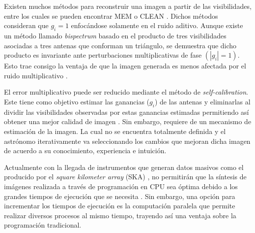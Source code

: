 
Existen muchos métodos para reconstruir una imagen a partir de las visibilidades, entre los cuales se pueden encontrar MEM  \citep{wu2012maximum} o CLEAN \citep{clean}. Dichos métodos consideran que $g_i=1$ enfocándose solamente en el ruido aditivo. Aunque existe un método llamado \textit{bispectrum} basado en el producto de tres visibilidades asociadas a tres antenas que conforman un triángulo, se demuestra que dicho producto es invariante ante perturbaciones multiplicativas de fase $(|g_i|=1)$. Esto trae consigo la ventaja de que la imagen generada es menos afectada por el ruido multiplicativo \citep{1958MNRAS.118..276J}.

El error multiplicativo puede ser reducido mediante el método de \textit{self-calibration}. Este tiene como objetivo estimar las ganancias ($g_i$) de las antenas y eliminarlas al dividir las visibilidades observadas por estas ganancias estimadas permitiendo así obtener una mejor calidad de imagen \citep{selfCalibration}. Sin embargo, requiere de un mecanismo de estimación de la imagen. La cual no se encuentra totalmente definida y el astrónomo iterativamente va seleccionando los cambios que mejoran dicha imagen de acuerdo a su conocimiento, experiencia e intuición.

Actualmente con la llegada de instrumentos que generan datos masivos como el producido por el \textit{square kilometer array} (SKA) \citep{ska}, no permitirán que la síntesis de imágenes realizada a través de programación en CPU sea óptima debido a los grandes tiempos de ejecución que se necesita \citep{carcamo2018multi, cottonGPU}. Sin embargo, una opción para incrementar los tiempos de ejecución es la computación paralela que permite realizar diversos procesos al mismo tiempo, trayendo así una ventaja sobre la programación tradicional.

